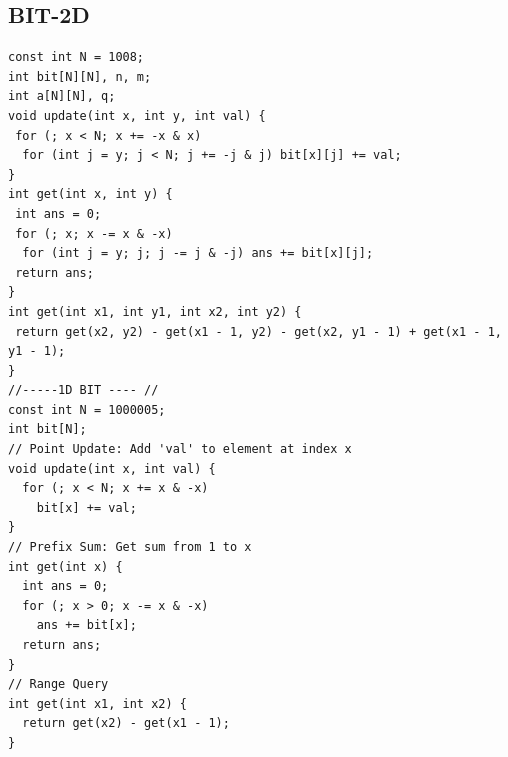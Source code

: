 \documentclass[a4paper,11pt,oneside]{article}
\begin{document}
\begin{multicols*}{\COLS}
\subsection{BIT-2D}
\begin{lstlisting}
const int N = 1008;
int bit[N][N], n, m;
int a[N][N], q;
void update(int x, int y, int val) {
 for (; x < N; x += -x & x)
  for (int j = y; j < N; j += -j & j) bit[x][j] += val;
}
int get(int x, int y) {
 int ans = 0;
 for (; x; x -= x & -x)
  for (int j = y; j; j -= j & -j) ans += bit[x][j];
 return ans;
}
int get(int x1, int y1, int x2, int y2) {
 return get(x2, y2) - get(x1 - 1, y2) - get(x2, y1 - 1) + get(x1 - 1, y1 - 1);
}
//-----1D BIT ---- //
const int N = 1000005; 
int bit[N];
// Point Update: Add 'val' to element at index x
void update(int x, int val) {
  for (; x < N; x += x & -x) 
    bit[x] += val;
}
// Prefix Sum: Get sum from 1 to x
int get(int x) {
  int ans = 0;
  for (; x > 0; x -= x & -x) 
    ans += bit[x];
  return ans;
}
// Range Query
int get(int x1, int x2) {
  return get(x2) - get(x1 - 1);
}
\end{lstlisting}

\end{multicols*}
\end{document}
